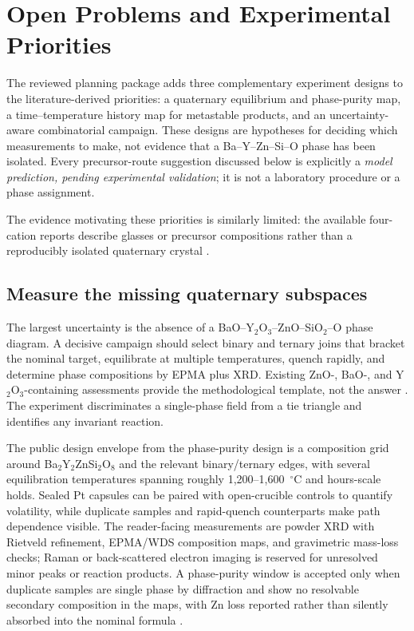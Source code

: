\section{Open Problems and Experimental Priorities}\label{sec:open}

The reviewed planning package adds three complementary experiment designs to the
literature-derived priorities: a quaternary equilibrium and phase-purity map, a
time--temperature history map for metastable products, and an uncertainty-aware
combinatorial campaign. These designs are hypotheses for deciding which
measurements to make, not evidence that a Ba--Y--Zn--Si--O phase has been
isolated. Every precursor-route suggestion discussed below is explicitly a
\emph{model prediction, pending experimental validation}; it is not a laboratory
procedure or a phase assignment.

The evidence motivating these priorities is similarly limited: the available
four-cation reports describe glasses or precursor compositions rather than a
reproducibly isolated quaternary crystal \cite{kozhevnikova2024synthesis,kaur2011influence,sayyed2026physical}.

\subsection{Measure the missing quaternary subspaces}

The largest uncertainty is the absence of a BaO--Y$_2$O$_3$--ZnO--SiO$_2$--O phase diagram. A decisive campaign should select binary and ternary joins that bracket the nominal target, equilibrate at multiple temperatures, quench rapidly, and determine phase compositions by EPMA plus XRD. Existing ZnO-, BaO-, and Y$_2$O$_3$-containing assessments provide the methodological template, not the answer \cite{kim2025key,jeon2025phase,makrovets2023y2o3,shukla2018thermodynamic}. The experiment discriminates a single-phase field from a tie triangle and identifies any invariant reaction.

The public design envelope from the phase-purity design is a composition grid
around Ba$_2$Y$_2$ZnSi$_2$O$_8$ and the relevant binary\slash ternary edges, with
several equilibration temperatures spanning roughly 1,200--1,600~$^{\circ}$C
and hours-scale holds. Sealed Pt capsules can be paired with open-crucible
controls to quantify volatility, while duplicate samples and rapid-quench
counterparts make path dependence visible. The reader-facing measurements are
powder XRD with Rietveld refinement, EPMA\slash WDS composition maps, and gravimetric
mass-loss checks; Raman or back-scattered electron imaging is reserved for
unresolved minor peaks or reaction products. A phase-purity window is accepted
only when duplicate samples are single phase by diffraction and show no
resolvable secondary composition in the maps, with Zn loss reported rather than
silently absorbed into the nominal formula \cite{kim2025key,derensy2026phase,makrovets2023y2o3}.

